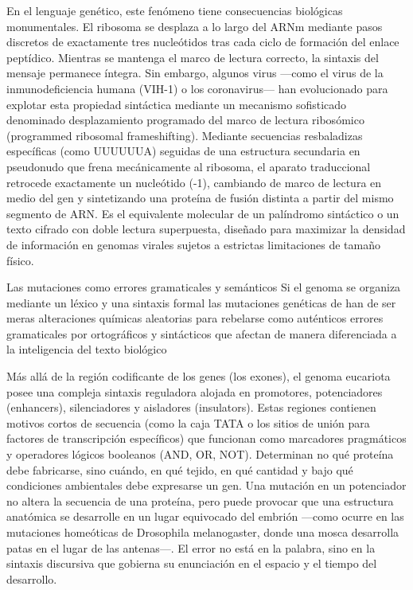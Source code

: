 En el lenguaje genético, este fenómeno tiene consecuencias biológicas monumentales. El ribosoma se desplaza a lo largo del ARNm mediante pasos discretos de exactamente tres nucleótidos tras cada ciclo de formación del enlace peptídico. 
Mientras se mantenga el marco de lectura correcto, la sintaxis del mensaje permanece íntegra. Sin embargo, algunos virus —como el virus de la inmunodeficiencia humana (VIH-1) o los coronavirus— han evolucionado para explotar esta propiedad sintáctica mediante un mecanismo sofisticado denominado desplazamiento programado del marco de lectura ribosómico (programmed ribosomal frameshifting). 
Mediante secuencias resbaladizas específicas (como UUUUUUA) seguidas de una estructura secundaria en pseudonudo que frena mecánicamente al ribosoma, el aparato traduccional retrocede exactamente un nucleótido (-1), cambiando de marco de lectura en medio del gen y sintetizando una proteína de fusión distinta a partir del mismo segmento de ARN. 
Es el equivalente molecular de un palíndromo sintáctico o un texto cifrado con doble lectura superpuesta, diseñado para maximizar la densidad de información en genomas virales sujetos a estrictas limitaciones de tamaño físico.

Las mutaciones como errores gramaticales y semánticos
Si el genoma se organiza mediante un léxico y una sintaxis formal las mutaciones genéticas de han de ser meras alteraciones químicas aleatorias para rebelarse como auténticos errores gramaticales por ortográficos y sintácticos que afectan de manera diferenciada a la inteligencia del texto biológico

Más allá de la región codificante de los genes (los exones), el genoma eucariota posee una compleja sintaxis reguladora alojada en promotores, potenciadores (enhancers), silenciadores y aisladores (insulators). 
Estas regiones contienen motivos cortos de secuencia (como la caja TATA o los sitios de unión para factores de transcripción específicos) que funcionan como marcadores pragmáticos y operadores lógicos booleanos (AND, OR, NOT). 
Determinan no qué proteína debe fabricarse, sino cuándo, en qué tejido, en qué cantidad y bajo qué condiciones ambientales debe expresarse un gen. Una mutación en un potenciador no altera la secuencia de una proteína, pero puede provocar que una estructura anatómica se desarrolle en un lugar equivocado del embrión —como ocurre en las mutaciones homeóticas de Drosophila melanogaster, donde una mosca desarrolla patas en el lugar de las antenas—.
El error no está en la palabra, sino en la sintaxis discursiva que gobierna su enunciación en el espacio y el tiempo del desarrollo.

